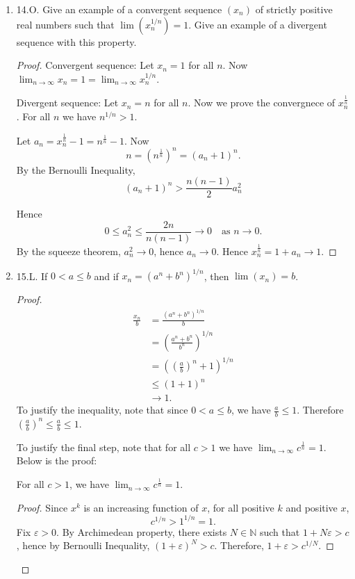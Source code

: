 \begin{enumerate}
\item 14.O. Give an example of a convergent sequence $\left(x_n\right)$ of strictly positive real numbers such that $\lim \left(x_n^{1 / n}\right)=1$. Give an example of a divergent sequence with this property.
\begin{proof}
	Convergent sequence: Let $x_n = 1$ for all $n$. Now $\lim_{n \to \infty} x_n = 1 = \lim_{n \to \infty} x_n^{1 / n}$.

	Divergent sequence: Let $x_n = n$ for all  $n$. Now we prove the convergnece of $x_n^{\frac{1}{n}}$. For all $n$ we have $n^{1 / n} > 1$.

	Let $a_n = x_n^{\frac{1}{n}} - 1 = n^{\frac{1}{n}}-1$.
	Now
	\[
		n = (n^{\frac{1}{n}})^n = (a_n + 1)^n
	.\] 
	By the Bernoulli Inequality,
	\[
		(a_n+1)^n > \frac{n(n-1)}{2}a_n^2
	\]
	
	Hence \[
		0 \le  a_n^2 \le  \frac{2n}{n(n-1)} \to 0 \quad \text{as } n \to 0
	.\] 
	By the squeeze theorem, $a_n^2 \to  0$, hence $a_n \to  0$. Hence $x_n^{\frac{1}{n}} = 1 + a_n \to 1$.
	

\end{proof}


\item 15.L. If $0<a \leq b$ and if $x_n=\left(a^n+b^n\right)^{1 / n}$, then $\lim \left(x_n\right)=b$.
\begin{proof}
	\begin{align*}
		\frac{x_n}{b} &= \frac{(a^n + b^n)^{1 / n}}{b}\\
		&=  \left( \frac{a^n + b^n}{b^n} \right) ^{1 / n}\\
		&= \left( \left( \frac{a}{b} \right) ^n+1 \right) ^{1 / n} \\
		&\le (1 + 1)^{n}\\
		& \to 1
	.\end{align*}
	To justify the inequality, note that since $0<a\le b$, we have $\frac{a}{b}\le 1$. Therefore $\left( \frac{a}{b} \right) ^n \le \frac{a}{b} \le 1$.

	To justify the final step, note that for all $c>1$ we have $\lim_{n \to \infty} c^{\frac{1}{n}} = 1$. Below is the proof:
\begin{lemma}
	For all $c > 1$, we have $\lim_{n \to \infty} c^{\frac{1}{n}} = 1$.

	\begin{proof}
		Since $x^k$ is an increasing function of $x$, for all positive $k$ and positive $x$, 
		\[
			c^{1 / n} > 1^{1 / n} = 1
		.\] 
		Fix $\varepsilon>0$. By Archimedean property, there exists $N \in \mathbb{N}$ such that $1 + N \varepsilon>c$, hence by Bernoulli Inequality, $(1 + \varepsilon)^N > c$. Therefore, $1+\varepsilon>c^{1 / N}$.


\end{proof}
\end{lemma}
\end{proof}
\end{enumerate}
